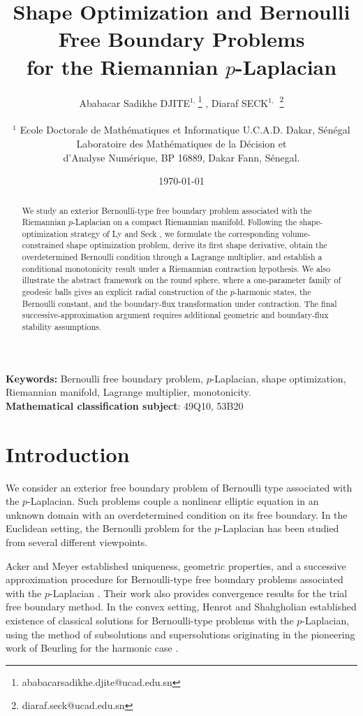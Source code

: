 \documentclass[11pt,a4paper]{article}
\title{\textbf{Shape Optimization and Bernoulli Free Boundary Problems\\
for the Riemannian $p$-Laplacian}}
\author{Ababacar Sadikhe DJITE$^{1,\,}$\footnote{ababacarsadikhe.djite@ucad.edu.sn} ,  Diaraf SECK$^{1,\,}$ \footnote{diaraf.seck@ucad.edu.sn}\\\\
$^{1}$ Ecole Doctorale de Math\'ematiques et Informatique U.C.A.D. Dakar,  S\'en\'egal\\
Laboratoire des Math\'ematiques de la D\'ecision et \\
d'Analyse Num\'erique, BP 16889, Dakar Fann, S\'enegal.}
\date{\today}
\theoremstyle{definition}
\theoremstyle{remark}
\begin{document}
\maketitle

\begin{abstract}
We study an exterior Bernoulli-type free boundary problem associated
with the Riemannian $p$-Laplacian on a compact Riemannian manifold.
Following the shape-optimization strategy of Ly and Seck \cite{LySeck2003}, we formulate
the corresponding volume-constrained shape optimization problem,
derive its first shape derivative, obtain the overdetermined Bernoulli
condition through a Lagrange multiplier, and establish a conditional
monotonicity result under a Riemannian contraction hypothesis. We also
illustrate the abstract framework on the round sphere, where a one-parameter family of geodesic balls gives an explicit radial
construction of the $p$-harmonic states, the Bernoulli constant, and the
boundary-flux transformation under contraction. The final
successive-approximation argument requires additional geometric and
boundary-flux stability assumptions.
\end{abstract}

\noindent\textbf{Keywords:}
Bernoulli free boundary problem, $p$-Laplacian, shape optimization,
Riemannian manifold, Lagrange multiplier, monotonicity.\\
{\bf Mathematical classification subject}: 49Q10, 53B20
\section{Introduction}

We consider an exterior free boundary problem of Bernoulli type
associated with the $p$-Laplacian. Such problems couple a nonlinear
elliptic equation in an unknown domain with an overdetermined
condition on its free boundary. In the Euclidean setting, the
Bernoulli problem for the $p$-Laplacian has been studied from several
different viewpoints.

Acker and Meyer established uniqueness, geometric properties, and a
successive approximation procedure for Bernoulli-type free boundary
problems associated with the $p$-Laplacian \cite{AckerMeyer1995}.
Their work also provides convergence results for the trial free
boundary method. In the convex setting, Henrot and Shahgholian
established existence of classical solutions for Bernoulli-type
problems with the $p$-Laplacian, using the method of subsolutions and
supersolutions originating in the pioneering work of Beurling for
the harmonic case \cite{Beurling1957,HenrotShahgholian2000}.
\end{document}
